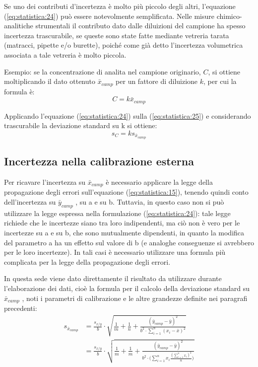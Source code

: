 Se uno dei contributi d'incertezza è molto più piccolo degli altri, l'equazione (\ref{eq:statistica:24}) può essere notevolmente semplificata. Nelle misure chimico-analitiche strumentali il contributo dato dalle diluizioni del campione ha spesso incertezza trascurabile, se queste sono state fatte mediante vetreria tarata (matracci, pipette e/o burette), poiché come già detto l'incertezza volumetrica associata a tale vetreria è molto piccola.

Esempio: se la concentrazione di analita nel campione originario, $C$, si ottiene moltiplicando il dato ottenuto $\bar{x}_{camp}$ per un fattore di diluizione $k$, per cui la formula è:
\begin{equation} \label{eq:statistica:25}
C = k \bar{x}_{camp}
\end{equation}

Applicando l'equazione (\ref{eq:statistica:24}) sulla (\ref{eq:statistica:25}) e considerando trascurabile la deviazione standard su k si ottiene:
\begin{equation} \label{eq:statistica:26}
s_C = k s_{\bar{x}_{camp}}
\end{equation}

\subsection{Incertezza nella calibrazione esterna}

Per ricavare l'incertezza su $\bar{x}_{camp}$ è necessario applicare la legge della propagazione degli errori sull'equazione (\ref{eq:statistica:15}), tenendo quindi conto dell'incertezza su $\bar{y}_{camp}$ , su a e su b. Tuttavia, in questo caso non si può utilizzare la legge espressa nella formulazione (\ref{eq:statistica:24}): tale legge richiede che le incertezze siano tra loro indipendenti, ma ciò non è vero per le incertezze su a e su b, che sono mutualmente dipendenti, in quanto la modifica del parametro a ha un effetto sul valore di b (e analoghe conseguenze si avrebbero per le loro incertezze). In tali casi è necessario utilizzare una formula più complicata per la legge della propagazione degli errori.

In questa sede viene dato direttamente il risultato da utilizzare durante l'elaborazione dei dati, cioè la formula per il calcolo della deviazione standard su $\bar{x}_{camp}$ , noti i parametri di calibrazione e le altre grandezze definite nei paragrafi precedenti:
\begin{align} \label{eq:statistica:27}
s_{\bar{x}_{camp}} & = \frac{s_{x/y}}{b} \cdot \sqrt{\frac{1}{m} + \frac{1}{n} + \frac{(\bar{y}_{camp} - \bar{y})^2}{b^2 \cdot \sum_{i=1}^n (x_i - \bar{x})^2}}\\
& = \frac{s_{x/y}}{b} \cdot \sqrt{\frac{1}{m} + \frac{1}{m} + \frac{(\bar{y}_{camp} - \bar{y})^2}{b^2 \cdot \Biggl(\sum_{i=1}^n x_i \frac{(\sum_{i=1}^n x_i)^2}{n} \Biggr)}}
\end{align}


